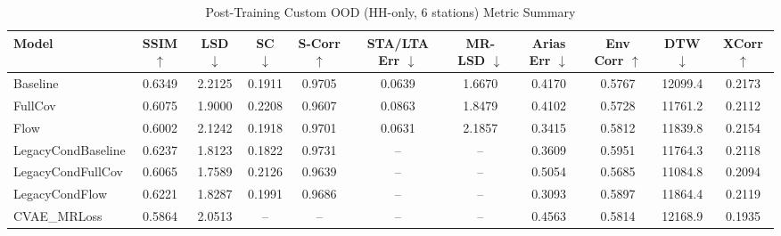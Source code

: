 
\begin{table}[ht]
\centering
\small
\caption{Post-Training Custom OOD (HH-only, 6 stations) Metric Summary}
\label{tab:post_training_custom_ood_metrics}
\begin{tabular}{lcccccccccc}
\hline
Model & SSIM $\uparrow$ & LSD $\downarrow$ & SC $\downarrow$ & S-Corr $\uparrow$ & STA/LTA Err $\downarrow$ & MR-LSD $\downarrow$ & Arias Err $\downarrow$ & Env Corr $\uparrow$ & DTW $\downarrow$ & XCorr $\uparrow$ \\
\hline
Baseline   & 0.6349 & 2.2125 & 0.1911 & 0.9705 & 0.0639 & 1.6670 & 0.4170 & 0.5767 & 12099.4 & 0.2173 \\
FullCov    & 0.6075 & 1.9000 & 0.2208 & 0.9607 & 0.0863 & 1.8479 & 0.4102 & 0.5728 & 11761.2 & 0.2112 \\
Flow       & 0.6002 & 2.1242 & 0.1918 & 0.9701 & 0.0631 & 2.1857 & 0.3415 & 0.5812 & 11839.8 & 0.2154 \\
LegacyCondBaseline  & 0.6237 & 1.8123 & 0.1822 & 0.9731 & --     & --     & 0.3609 & 0.5951 & 11764.3 & 0.2118 \\
LegacyCondFullCov   & 0.6065 & 1.7589 & 0.2126 & 0.9639 & --     & --     & 0.5054 & 0.5685 & 11084.8 & 0.2094 \\
LegacyCondFlow      & 0.6221 & 1.8287 & 0.1991 & 0.9686 & --     & --     & 0.3093 & 0.5897 & 11864.4 & 0.2119 \\
CVAE\_MRLoss & 0.5864 & 2.0513 & --     & --     & --     & --     & 0.4563 & 0.5814 & 12168.9 & 0.1935 \\
\hline
\end{tabular}
\end{table}

